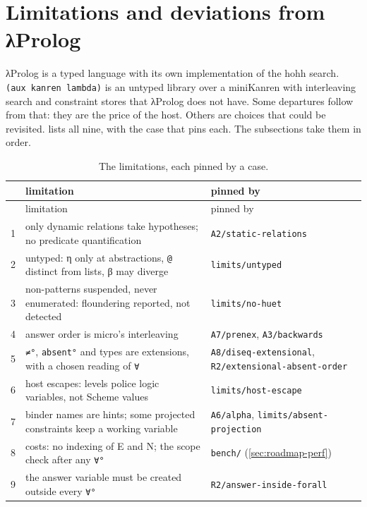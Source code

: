 \section{Limitations and deviations from λProlog}\label{sec:roadmap-limits}

λProlog is a typed language with its own implementation of the hohh search. \texttt{(aux kanren lambda)}
is an untyped library over a miniKanren with interleaving search and constraint stores that λProlog
does not have. Some departures follow from that: they are the price of the host. Others are choices that
could be revisited.  lists all nine, with the case that pins each. The
subsections take them in order.

\begin{longtable}{@{}r>{\raggedright\arraybackslash}p{0.54\fullwidthlen}>{\raggedright\arraybackslash}p{0.37\fullwidthlen}@{}}
\caption{The limitations, each pinned by a case.}\label{tab:roadmap-limits}\\
\toprule
& limitation & pinned by \\
\midrule\endfirsthead
\toprule
& limitation & pinned by \\
\midrule\endhead
1 & only dynamic relations take hypotheses; no predicate quantification & \texttt{A2/static-relations} \\
2 & untyped: η only at abstractions, \texttt{@} distinct from lists, β may diverge & \texttt{limits/untyped} \\
3 & non-patterns suspended, never enumerated: floundering reported, not detected & \texttt{limits/no-huet} \\
4 & answer order is micro's interleaving & \texttt{A7/prenex}, \texttt{A3/backwards} \\
5 & \texttt{≠°}, \texttt{absent°} and types are extensions, with a chosen reading of \texttt{∀} & \texttt{A8/diseq-extensional}, \texttt{R2/extensional-absent-order} \\
6 & host escapes: levels police logic variables, not Scheme values & \texttt{limits/host-escape} \\
7 & binder names are hints; some projected constraints keep a working variable & \texttt{A6/alpha}, \texttt{limits/absent-projection} \\
8 & costs: no indexing of E and N; the scope check after any \texttt{∀°} & \texttt{bench/} (\cref{sec:roadmap-perf}) \\
9 & the answer variable must be created outside every \texttt{∀°} & \texttt{R2/answer-inside-forall} \\
\bottomrule
\end{longtable}

